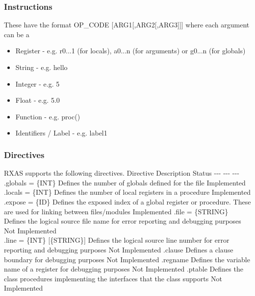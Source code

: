 \subsubsection{Instructions}

These have the format OP\_CODE {[}ARG1{[},ARG2{[},ARG3{]}{]}{]} where each argument can be a

\begin{itemize}
\item Register - e.g. r0...1 (for locals), a0...n (for arguments) or g0...n (for globals)

\item String - e.g. \textquotedbl{}hello\textquotedbl{}

\item Integer - e.g. 5

\item Float - e.g. 5.0

\item Function - e.g. proc()

\item Identifiers / Label - e.g. label1

\end{itemize}

\subsubsection{Directives}

RXAS supports the following directives.
\textbar{} Directive \textbar{} Description \textbar{} Status \textbar{}
\textbar{} -{}-{}- \textbar{} -{}-{}- \textbar{} -{}-{}- \textbar{}
\textbar{} .globals = \{INT\} \textbar{} Defines the number of globals defined for the file \textbar{} Implemented \textbar{}
\textbar{} .locals = \{INT\} \textbar{} Defines the number of local registers in a procedure \textbar{} Implemented \textbar{}
\textbar{} .expose = \{ID\} \textbar{} Defines the exposed index of a global register or procedure. These are used for linking between files/modules \textbar{} Implemented \textbar{}
\textbar{} .file = \{STRING\} \textbar{} Defines the logical source file name for error reporting and debugging purposes \textbar{} Not Implemented \textbar{}\\
\textbar{} .line = \{INT\} {[}\{STRING\}{]} \textbar{} Defines the logical source line number for error reporting and debugging purposes \textbar{} Not Implemented \textbar{}
\textbar{} .clause \textbar{} Defines a clause boundary for debugging purposes \textbar{} Not Implemented \textbar{}
\textbar{} .regname \textbar{} Defines the variable name of a register for debugging purposes \textbar{} Not Implemented \textbar{}
\textbar{} .ptable \textbar{} Defines the class procedures implementing the interfaces that the class supports \textbar{} Not Implemented \textbar{}

